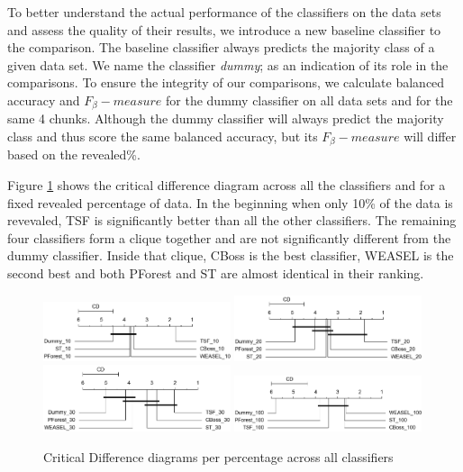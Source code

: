 To better understand the actual performance of the classifiers on the data sets and assess the quality of their results, we introduce a new baseline classifier to the comparison.
The baseline classifier always predicts the majority class of a given data set.
We name the classifier \emph{dummy}; as an indication of its role in the comparisons.
To ensure the integrity of our comparisons, we calculate balanced accuracy and $F_{\beta}-measure$ for the dummy classifier on all data sets and for the same 4 chunks.
Although the dummy classifier will always predict the majority class and thus score the same balanced accuracy, but its $F_{\beta}-measure$ will differ based on the revealed\%.

Figure \ref{fig:CDAcross} shows the critical difference diagram across all the classifiers and for a fixed revealed percentage of data.
In the beginning when only 10\% of the data is revevaled, TSF is significantly better than all the other classifiers.
The remaining four classifiers form a clique together and are not significantly different from the dummy classifier.
Inside that clique, CBoss is the best classifier, WEASEL is the second best and both PForest and ST are almost identical in their ranking.

\begin{figure}
    \captionsetup{justification=raggedright}
    \includegraphics[width=0.49\textwidth,keepaspectratio]{cd_hm_across_10pct_with_dummy.png}
    \includegraphics[width=0.49\textwidth,keepaspectratio]{cd_hm_across_20pct_with_dummy.png}
    \\[\smallskipamount]
    \includegraphics[width=0.49\textwidth,keepaspectratio]{cd_hm_across_30pct_with_dummy.png}
    \includegraphics[width=0.49\textwidth,keepaspectratio]{cd_hm_across_100pct_with_dummy.png}
    \caption{Critical Difference diagrams per percentage across all classifiers}
    \label{fig:CDAcross}
\end{figure}

